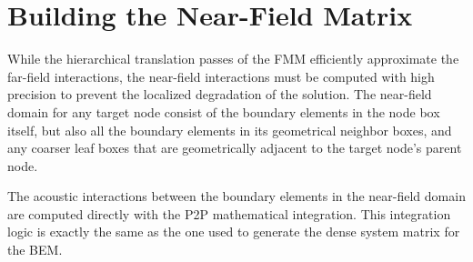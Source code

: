 \section{Building the Near-Field Matrix} \label{sec:near-field}

While the hierarchical translation passes of the \ac{FMM} efficiently approximate the far-field interactions, the near-field interactions must be computed with high precision to prevent the localized degradation of the solution. 
The near-field domain for any target node consist of the boundary elements in the node box itself, but also all the boundary elements in its geometrical neighbor boxes, and any coarser leaf boxes that are geometrically adjacent to the target node's parent node.

The acoustic interactions between the boundary elements in the near-field domain are computed directly with the \acf{P2P} mathematical integration. 
This integration logic is exactly the same as the one used to generate the dense system matrix for the \ac{BEM}.